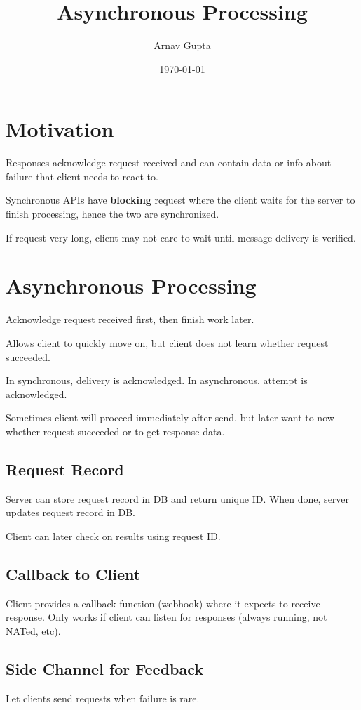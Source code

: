 \documentclass[11pt]{article}
\author{Arnav Gupta}
\date{\today}
\title{Asynchronous Processing}
\begin{document}
\maketitle
\tableofcontents

\section{Motivation}
\label{sec:org963d81d}
Responses acknowledge request received and can contain data or info about failure
that client needs to react to.

Synchronous APIs have \textbf{blocking} request where the client waits for the server to
finish processing, hence the two are synchronized.

If request very long, client may not care to wait until message delivery is
verified.
\section{Asynchronous Processing}
\label{sec:orgc84ea70}
Acknowledge request received first, then finish work later.

Allows client to quickly move on, but client does not learn whether request
succeeded.

In synchronous, delivery is acknowledged. In asynchronous, attempt is
acknowledged.

Sometimes client will proceed immediately after send, but later want to now
whether request succeeded or to get response data.
\subsection{Request Record}
\label{sec:org1aa4098}
Server can store request record in DB and return unique ID.
When done, server updates request record in DB.

Client can later check on results using request ID.
\subsection{Callback to Client}
\label{sec:org81fdb9f}
Client provides a callback function (webhook) where it expects to receive
response.
Only works if client can listen for responses (always running, not NATed, etc).
\subsection{Side Channel for Feedback}
\label{sec:orgb45dbdc}
Let clients send requests when failure is rare.
\end{document}

